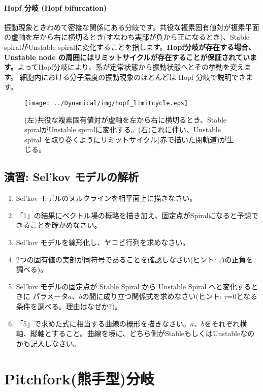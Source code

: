 \paragraph{Hopf 分岐 (Hopf bifurcation)}
振動現象ときわめて密接な関係にある分岐です。共役な複素固有値対が複素平面の虚軸を左から右に横切るとき(すなわち実部が負から正になるとき)、Stable spiralがUnstable spiralに変化することを指します。{\bf Hopf分岐が存在する場合、Unstable node の周囲にはリミットサイクルが存在することが保証されています。}よってHopf分岐により、系が定常状態から振動状態へとその挙動を変えます。
細胞内における分子濃度の振動現象のほとんどは Hopf 分岐で説明できます。

\begin{figure}[ht]
        \centering \texttt{[image: ../Dynamical/img/hopf\_limitcycle.eps]}
        \caption{(左)共役な複素固有値対が虚軸を左から右に横切るとき、Stable spiralがUnstable spiralに変化する。(右)これに伴い、Unstable spiral を取り巻くようにリミットサイクル(赤で描いた閉軌道)が生じる。}
        \label{fig:10sysbio} \end{figure}


\subsection{演習: Sel'kov モデルの解析}
\begin{enumerate}
\item Sel'kov モデルのヌルクラインを相平面上に描きなさい。
\item 「1」の結果にベクトル場の概略を描き加え、固定点がSpiralになると予想できることを確かめなさい。
\item Sel'kov モデルを線形化し、ヤコビ行列を求めなさい。
\item 2つの固有値の実部が同符号であることを確認しなさい(ヒント: \(\Delta\)の正負を調べる)。
\item Sel'kov モデルの固定点が Stable Spiral から Unstable Spiral へと変化するときに パラメータ\(a\)、\(b\)の間に成り立つ関係式を求めなさい(ヒント: \(\tau\)=0となる条件を調べる。理由はなぜか?)。
\item 「5」で求めた式に相当する曲線の概形を描きなさい。\(a\)、\(b\)をそれぞれ横軸、縦軸とすること。曲線を境に、どちら側がStableもしくはUnstableなのかも記入しなさい。
\end{enumerate}



\section{Pitchfork(熊手型)分岐}
